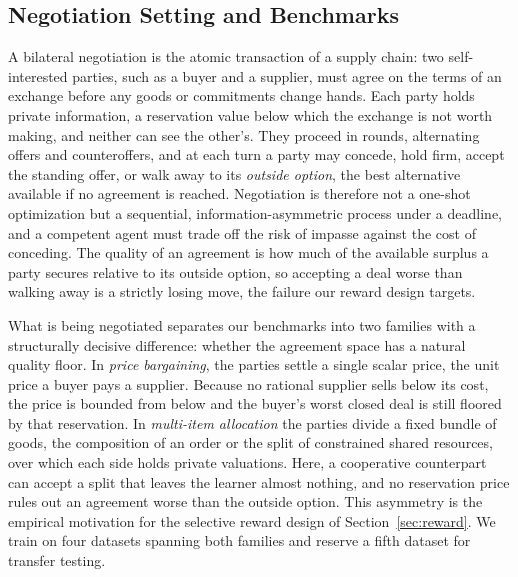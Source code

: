 \documentclass{interact}
\theoremstyle{plain}
\theoremstyle{definition}
\theoremstyle{remark}
\begin{document}
\subsection{Negotiation Setting and Benchmarks}\label{sec:benchmarks}

A bilateral negotiation is the atomic transaction of a supply chain: two self-interested parties, such as a buyer and a supplier, must agree on the terms of an exchange before any goods or commitments change hands. Each party holds private information, a reservation value below which the exchange is not worth making, and neither can see the other's. They proceed in rounds, alternating offers and counteroffers, and at each turn a party may concede, hold firm, accept the standing offer, or walk away to its \emph{outside option}, the best alternative available if no agreement is reached. Negotiation is therefore not a one-shot optimization but a sequential, information-asymmetric process under a deadline, and a competent agent must trade off the risk of impasse against the cost of conceding. The quality of an agreement is how much of the available surplus a party secures relative to its outside option, so accepting a deal worse than walking away is a strictly losing move, the failure our reward design targets.

What is being negotiated separates our benchmarks into two families with a structurally decisive difference: whether the agreement space has a natural quality floor. In \emph{price bargaining}, the parties settle a single scalar price, the unit price a buyer pays a supplier. Because no rational supplier sells below its cost, the price is bounded from below and the buyer's worst closed deal is still floored by that reservation. In \emph{multi-item allocation} the parties divide a fixed bundle of goods, the composition of an order or the split of constrained shared resources, over which each side holds private valuations. Here, a cooperative counterpart can accept a split that leaves the learner almost nothing, and no reservation price rules out an agreement worse than the outside option. This asymmetry is the empirical motivation for the selective reward design of Section~\ref{sec:reward}. We train on four datasets spanning both families and reserve a fifth dataset for transfer testing.
\end{document}
